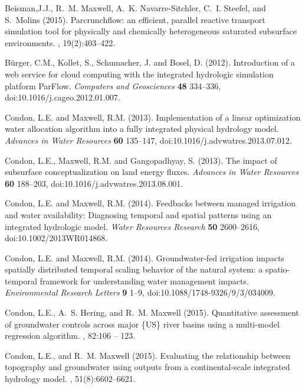 \begin{thebibliography}{999}
Beisman,J.J., R.~M. Maxwell, A.~K. Navarre-Sitchler, C.~I. Steefel, and
S.~Molins (2015).
\newblock Parcrunchflow: an efficient, parallel reactive transport simulation
  tool for physically and chemically heterogeneous saturated subsurface
  environments.
, 19(2):403--422.


B{\"u}rger, C.M., Kollet, S., Schumacher, J. and Bosel, D. (2012). Introduction of a web service for cloud computing with the integrated hydrologic simulation platform ParFlow. {\em Computers and Geosciences} {\bf 48} 334--336, doi:10.1016/j.cageo.2012.01.007.

Condon, L.E. and Maxwell, R.M. (2013). Implementation of a linear optimization water allocation algorithm into a fully integrated physical hydrology model. {\em Advances in Water Resources} {\bf 60} 135--147, doi:10.1016/j.advwatres.2013.07.012.

Condon, L.E., Maxwell, R.M. and Gangopadhyay, S. (2013). The impact of subsurface conceptualization on land energy fluxes. {\em Advances in Water Resources} {\bf 60} 188--203, doi:10.1016/j.advwatres.2013.08.001.

Condon, L.E. and Maxwell, R.M. (2014). Feedbacks between managed irrigation and water availability: Diagnosing temporal and spatial patterns using an integrated hydrologic model. {\em Water Resources Research} {\bf 50} 2600--2616, doi:10.1002/2013WR014868.

Condon, L.E. and Maxwell, R.M. (2014). Groundwater-fed irrigation impacts spatially distributed temporal scaling behavior of the natural system: a spatio-temporal framework for understanding water management impacts. {\em Environmental Research Letters} {\bf 9} 1--9, doi:10.1088/1748-9326/9/3/034009.

 Condon, L.E., A.~S. Hering, and R.~M. Maxwell (2015).
\newblock Quantitative assessment of groundwater controls across major \{US\}
  river basins using a multi-model regression algorithm.
, 82:106 -- 123.

Condon, L.E., and R.~M. Maxwell (2015).
\newblock Evaluating the relationship between topography and groundwater using
  outputs from a continental-scale integrated hydrology model.
, 51(8):6602--6621.




\end{thebibliography}
